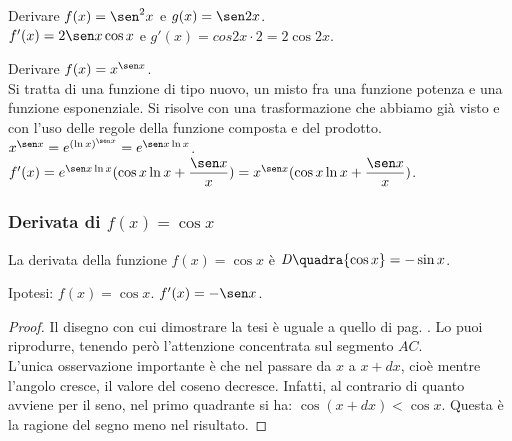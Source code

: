 \begin{esempio}
Derivare $f(x)=\sen^2 x$ e $g(x)= \sen 2x$.\\
$f'(x)=2\sen x \cos x$ e $g'(x)=cos 2x\cdot 2= 2 \cos 2x$.
\end{esempio}

\begin{esempio}
  Derivare $f(x)=x^{\sen x}$.\\
  Si tratta di una funzione di tipo nuovo, un misto fra una funzione potenza
  e una funzione esponenziale. Si risolve con una trasformazione che abbiamo
  già visto e con l'uso delle regole della funzione composta e del prodotto.\\
  $x^{\sen x}=e^{{(\ln x)}^{\sen x}}=e^{\sen x\ln x}$.\\
  $f'(x)=e^{\sen x\ln x}(\cos x \ln x +\dfrac{\sen x}{x})=
  x^{\sen x}(\cos x \ln x +\dfrac{\sen x}{x})$.
\end{esempio}

 \subsubsection{Derivata di $f(x)=\cos x$}
\begin{teorema}
  La derivata della funzione $f(x)=\cos x$ è $\mathit{D}\quadra{\cos x}=
  -\sin x$.
\end{teorema}
\noindent Ipotesi: $f(x)=\cos x$. \tab $f'(x)=-\sen x$.
\begin{proof}
  Il disegno con cui dimostrare la tesi è uguale a quello di pag.
  \pageref{fig_diff01dseno}. Lo puoi riprodurre, tenendo però l'attenzione
  concentrata sul segmento $AC$.\\
L'unica osservazione importante è che nel passare da $x$ a $ x+dx$, cioè mentre
l'angolo cresce, il valore del coseno decresce. Infatti, al contrario di quanto
avviene per il seno, nel primo quadrante si ha: $ \cos(x+dx)<\cos x$. Questa è 
la ragione del segno meno nel risultato.
\end{proof}

\begin{inaccessibleblock}
  \begin{minipage}[]{.47\textwidth}
    \begin{center} \coseno \end{center}
 \end{minipage} 
  \hfill
 \begin{minipage}[]{.47\textwidth}
 \begin{center} \tangenticoseno \end{center}
 \end{minipage}
\end{inaccessibleblock}
\label{}

